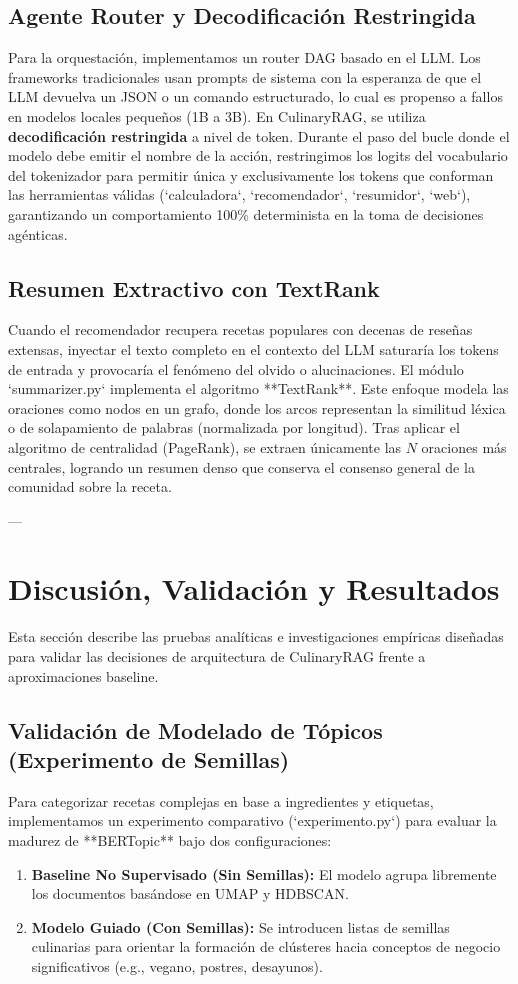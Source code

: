 \documentclass[11pt,a4paper]{article}
\begin{document}
\subsection{Agente Router y Decodificación Restringida}
Para la orquestación, implementamos un router DAG basado en el LLM. Los frameworks tradicionales usan prompts de sistema con la esperanza de que el LLM devuelva un JSON o un comando estructurado, lo cual es propenso a fallos en modelos locales pequeños (1B a 3B). 
En CulinaryRAG, se utiliza \textbf{decodificación restringida} a nivel de token. Durante el paso del bucle donde el modelo debe emitir el nombre de la acción, restringimos los logits del vocabulario del tokenizador para permitir única y exclusivamente los tokens que conforman las herramientas válidas (`calculadora`, `recomendador`, `resumidor`, `web`), garantizando un comportamiento 100\% determinista en la toma de decisiones agénticas.

\subsection{Resumen Extractivo con TextRank}
Cuando el recomendador recupera recetas populares con decenas de reseñas extensas, inyectar el texto completo en el contexto del LLM saturaría los tokens de entrada y provocaría el fenómeno del olvido o alucinaciones. 
El módulo `summarizer.py` implementa el algoritmo **TextRank**. Este enfoque modela las oraciones como nodos en un grafo, donde los arcos representan la similitud léxica o de solapamiento de palabras (normalizada por longitud). Tras aplicar el algoritmo de centralidad (PageRank), se extraen únicamente las $N$ oraciones más centrales, logrando un resumen denso que conserva el consenso general de la comunidad sobre la receta.

---

\section{Discusión, Validación y Resultados}

Esta sección describe las pruebas analíticas e investigaciones empíricas diseñadas para validar las decisiones de arquitectura de CulinaryRAG frente a aproximaciones baseline.

\subsection{Validación de Modelado de Tópicos (Experimento de Semillas)}
Para categorizar recetas complejas en base a ingredientes y etiquetas, implementamos un experimento comparativo (`experimento.py`) para evaluar la madurez de **BERTopic** bajo dos configuraciones:
\begin{enumerate}
    \item \textbf{Baseline No Supervisado (Sin Semillas):} El modelo agrupa libremente los documentos basándose en UMAP y HDBSCAN.
    \item \textbf{Modelo Guiado (Con Semillas):} Se introducen listas de semillas culinarias para orientar la formación de clústeres hacia conceptos de negocio significativos (e.g., vegano, postres, desayunos).
\end{enumerate}
\end{document}
